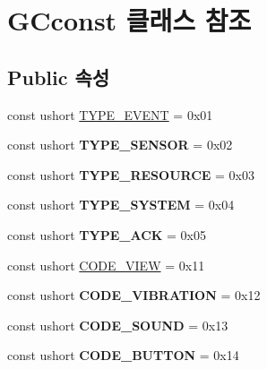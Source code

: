 \hypertarget{class_g_cconst}{}\section{G\+Cconst 클래스 참조}
\label{class_g_cconst}
\subsection*{Public 속성}
\begin{DoxyCompactItemize}
\item 
const ushort \hyperlink{class_g_cconst_a5653aff2918dd19b3ed466d054916b51}{T\+Y\+P\+E\+\_\+\+E\+V\+E\+N\+T} = 0x01
\item 
\hypertarget{class_g_cconst_a72b7c04c3445d1770a655edd795e4c29}{}const ushort {\bfseries T\+Y\+P\+E\+\_\+\+S\+E\+N\+S\+O\+R} = 0x02\label{class_g_cconst_a72b7c04c3445d1770a655edd795e4c29}

\item 
\hypertarget{class_g_cconst_a11646885ce03c7ddb48efbb0e9658ab2}{}const ushort {\bfseries T\+Y\+P\+E\+\_\+\+R\+E\+S\+O\+U\+R\+C\+E} = 0x03\label{class_g_cconst_a11646885ce03c7ddb48efbb0e9658ab2}

\item 
\hypertarget{class_g_cconst_aa0056eac08d938000e9646700c2d0bcf}{}const ushort {\bfseries T\+Y\+P\+E\+\_\+\+S\+Y\+S\+T\+E\+M} = 0x04\label{class_g_cconst_aa0056eac08d938000e9646700c2d0bcf}

\item 
\hypertarget{class_g_cconst_ae63a93090f18f29d89298619819e8669}{}const ushort {\bfseries T\+Y\+P\+E\+\_\+\+A\+C\+K} = 0x05\label{class_g_cconst_ae63a93090f18f29d89298619819e8669}

\item 
const ushort \hyperlink{class_g_cconst_a33241116bb534c10ba1a5400547a74b0}{C\+O\+D\+E\+\_\+\+V\+I\+E\+W} = 0x11
\item 
\hypertarget{class_g_cconst_ab1e62f52da01598fe4bc53ed3c7ca92d}{}const ushort {\bfseries C\+O\+D\+E\+\_\+\+V\+I\+B\+R\+A\+T\+I\+O\+N} = 0x12\label{class_g_cconst_ab1e62f52da01598fe4bc53ed3c7ca92d}

\item 
\hypertarget{class_g_cconst_a7d5513536bb3e4c3531629b03c6aeb75}{}const ushort {\bfseries C\+O\+D\+E\+\_\+\+S\+O\+U\+N\+D} = 0x13\label{class_g_cconst_a7d5513536bb3e4c3531629b03c6aeb75}

\item 
\hypertarget{class_g_cconst_aa2dd05e086062e16485a0ac55567040f}{}const ushort {\bfseries C\+O\+D\+E\+\_\+\+B\+U\+T\+T\+O\+N} = 0x14\label{class_g_cconst_aa2dd05e086062e16485a0ac55567040f}


\end{DoxyCompactItemize}
